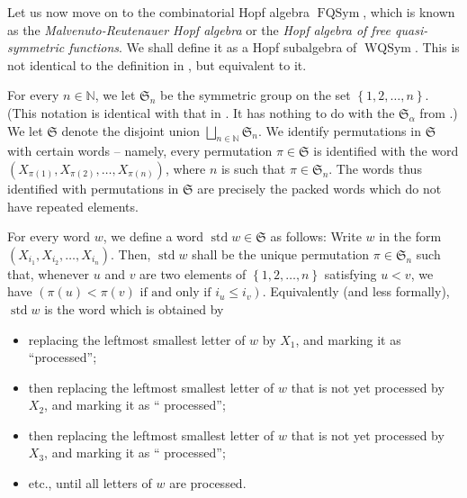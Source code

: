 \documentclass[numbers=enddot,12pt,final,onecolumn,notitlepage,abstracton]{scrartcl}%
\theoremstyle{definition}
\begin{document}
Let us now move on to the combinatorial Hopf algebra $\operatorname*{FQSym}$,
which is known as the \textit{Malvenuto-Reutenauer Hopf algebra} or the
\textit{Hopf algebra of free quasi-symmetric functions}. We shall define it as
a Hopf subalgebra of $\operatorname*{WQSym}$. This is not identical to the
definition in \cite[Section 8.1]{Reiner}, but equivalent to it.

For every $n\in\mathbb{N}$, we let $\mathfrak{S}_{n}$ be the symmetric group
on the set $\left\{  1,2,\ldots,n\right\}  $. (This notation is identical with
that in \cite{Reiner}. It has nothing to do with the $\mathfrak{S}_{\alpha}$
from \cite{BBSSZ}.) We let $\mathfrak{S}$ denote the disjoint union
$\bigsqcup_{n\in\mathbb{N}}\mathfrak{S}_{n}$. We identify permutations in
$\mathfrak{S}$ with certain words -- namely, every permutation $\pi
\in\mathfrak{S}$ is identified with the word $\left(  X_{\pi\left(  1\right)
},X_{\pi\left(  2\right)  },\ldots,X_{\pi\left(  n\right)  }\right)  $, where
$n$ is such that $\pi\in\mathfrak{S}_{n}$. The words thus identified with
permutations in $\mathfrak{S}$ are precisely the packed words which do not
have repeated elements.

For every word $w$, we define a word $\operatorname*{std}w\in\mathfrak{S}$ as
follows: Write $w$ in the form $\left(  X_{i_{1}},X_{i_{2}},\ldots,X_{i_{n}%
}\right)  $. Then, $\operatorname*{std}w$ shall be the unique permutation
$\pi\in\mathfrak{S}_{n}$ such that, whenever $u$ and $v$ are two elements of
$\left\{  1,2,\ldots,n\right\}  $ satisfying $u<v$, we have $\left(
\pi\left(  u\right)  <\pi\left(  v\right)  \text{ if and only if }i_{u}\leq
i_{v}\right)  $. Equivalently (and less formally), $\operatorname*{std}w$ is
the word which is obtained by

\begin{itemize}
\item replacing the leftmost smallest letter of $w$ by $X_{1}$, and marking it
as \textquotedblleft processed\textquotedblright;

\item then replacing the leftmost smallest letter of $w$ that is not yet
processed by $X_{2}$, and marking it as \textquotedblleft
processed\textquotedblright;

\item then replacing the leftmost smallest letter of $w$ that is not yet
processed by $X_{3}$, and marking it as \textquotedblleft
processed\textquotedblright;

\item etc., until all letters of $w$ are processed.
\end{itemize}
\end{document}

